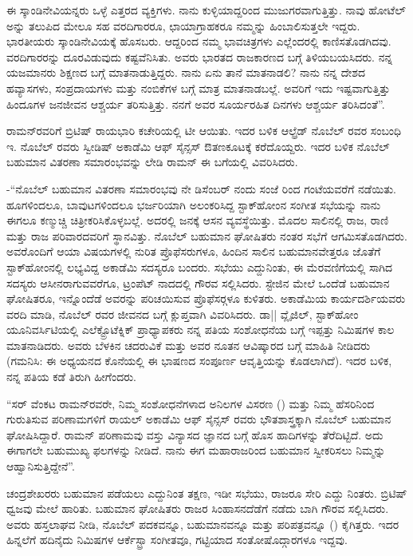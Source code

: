 ಈ ಸ್ಕಾಂಡಿನೇವಿಯನ್ನರು ಒಳ್ಳೆ ಎತ್ತರದ ವ್ಯಕ್ತಿಗಳು. ನಾನು ಕುಳ್ಳಿಯಾದ್ದರಿಂದ ಮುಜುಗರವಾಗುತ್ತಿತ್ತು. ನಾವು ಹೋಟೆಲ್ ಅನ್ನು ತಲುಪಿದ ಮೇಲೂ ಸಹ ವರದಿಗಾರರೂ, ಛಾಯಾಗ್ರಾಹಕರೂ ನಮ್ಮನ್ನು ಹಿಂಬಾಲಿಸುತ್ತಲೇ ಇದ್ದರು. ಭಾರತೀಯರು ಸ್ಕಾಂಡಿನೇವಿಯಕ್ಕೆ ಹೊಸಬರು. ಆದ್ದರಿಂದ ನಮ್ಮ ಭಾವಚಿತ್ರಗಳು ಎಲ್ಲೆಂದರಲ್ಲಿ ಕಾಣಿಸತೊಡಗಿದವು. ವರದಿಗಾರರನ್ನು ದೂರವಿಡುವುದು ಕಷ್ಟವೆನಿಸಿತು. ಅವರು ಭಾರತದ ರಾಜಕಾರಣದ ಬಗ್ಗೆ ತಿಳಿಯಬಯಸಿದರು. ನನ್ನ ಯಜಮಾನರು ಶಿಕ್ಷಣದ ಬಗ್ಗೆ ಮಾತನಾಡುತ್ತಿದ್ದರು. ನಾನು ಏನು ತಾನೆ ಮಾತನಾಡಲಿ? ನಾನು ನನ್ನ ದೇಶದ ಹವ್ಯಾಸಗಳು, ಸಂಪ್ರದಾಯಗಳು ಮತ್ತು ನಂಬಿಕೆಗಳ ಬಗ್ಗೆ ಮಾತ್ರ ಮಾತನಾಡಬಲ್ಲೆ. ಅವರಿಗೆ ಇದು ಇಷ್ಟವಾಗುತ್ತಿತ್ತು ಹಿಂದೂಗಳ ಜನಜೀವನ ಆಶ್ಚರ್ಯ ತರಿಸುತ್ತಿತ್ತು. ನನಗೆ ಅವರ ಸೂರ್ಯರಹಿತ ದಿನಗಳು ಆಶ್ಚರ್ಯ ತರಿಸಿದಂತೆ”.

ರಾಮನ್‍ರವರಿಗೆ ಬ್ರಿಟಿಷ್ ರಾಯಭಾರಿ ಕಚೇರಿಯಲ್ಲಿ ಟೀ ಆಯಿತು. ಇದರ ಬಳಿಕ ಆಲ್ಫ್ರೆಡ್ ನೊಬೆಲ್ ರವರ ಸಂಬಂಧಿ ಇ. ನೊಬೆಲ್ ರವರು ಸ್ವೀಡಿಷ್ ಅಕಾಡೆಮಿ ಆಫ್ ಸೈನ್ಸಸ್ ಔತಣಕೂಟಕ್ಕೆ ಕರೆದೊಯ್ದರು. ಇದರ ಬಳಿಕ ನೊಬೆಲ್ ಬಹುಮಾನ ವಿತರಣಾ ಸಮಾರಂಭವನ್ನು ಲೇಡಿ ರಾಮನ್ ಈ ಬಗೆಯಲ್ಲಿ ವಿವರಿಸಿದರು.

-“ನೊಬೆಲ್ ಬಹುಮಾನ ವಿತರಣಾ ಸಮಾರಂಭವು ನೇ ಡಿಸೆಂಬರ್ ನಂದು ಸಂಜೆ  ರಿಂದ  ಗಂಟೆಯವರೆಗೆ ನಡೆಯಿತು. ಹೂಗಳಿಂದಲೂ, ಬಾವುಟಗಳಿಂದಲೂ ಭರ್ಜರಿಯಾಗಿ ಅಲಂಕರಿಸಿದ್ದ ಸ್ಟಾಕ್‍ಹೋಂನ ಸಂಗೀತ ಸಭೆಯನ್ನು ನಾನು ಈಗಲೂ ಕಣ್ಮುಚ್ಚಿ ಚಿತ್ರೀಕರಿಸಿಕೊಳ್ಳಬಲ್ಲೆ. ಅದರಲ್ಲಿ  ಜನಕ್ಕೆ ಆಸನ ವ್ಯವಸ್ಥೆಯಿತ್ತು. ಮೊದಲ ಸಾಲಿನಲ್ಲಿ ರಾಜ, ರಾಣಿ ಮತ್ತು ರಾಜ ಪರಿವಾರದವರಿಗೆ ಸ್ಥಾನವಿತ್ತು. ನೊಬೆಲ್ ಬಹುಮಾನ ಘೋಷಿತರು ನಂತರ ಸಭೆಗೆ ಆಗಮಿಸತೊಡಗಿದರು. ಅವರೊಂದಿಗೆ ಆಯಾ ವಿಷಯಗಳಲ್ಲಿ ನುರಿತ ಪ್ರೊಫೆಸರುಗಳೂ, ಹಿಂದಿನ ಸಾಲಿನ ಬಹುಮಾನವೇತ್ತರೂ ಜೊತೆಗೆ ಸ್ಟಾಕ್‍ಹೋಂನಲ್ಲಿ ಲಭ್ಯವಿದ್ದ ಅಕಾಡೆಮಿ ಸದಸ್ಯರೂ ಬಂದರು. ಸಭೆಯು ಎದ್ದುನಿಂತು, ಈ ಮೆರವಣಿಗೆಯಲ್ಲಿ ಸಾಗಿದ ಸದಸ್ಯರು ಆಸೀನರಾಗುವವರೆಗೂ, ಟ್ರಂಪೆಟ್ ನಾದದಲ್ಲಿ ಗೌರವ ಸಲ್ಲಿಸಿದರು. ಸ್ಟೇಜಿನ ಮೇಲೆ ಒಂದೆಡೆ ಬಹುಮಾನ ಘೋಷಿತರೂ, ಇನ್ನೊಂದೆಡೆ ಅವರನ್ನು ಪರಿಚಯಿಸುವ ಪ್ರೊಫೆಸರ್‍ಗಳೂ ಕುಳಿತರು. ಅಕಾಡೆಮಿಯ ಕಾರ್ಯದರ್ಶಿಯವರು ವರದಿ ಮಾಡಿ, ನೊಬೆಲ್ ರವರ ಜೀವನದ ಬಗ್ಗೆ ಕ್ಲುಪ್ತವಾಗಿ ವಿವರಿಸಿದರು. ಡಾ|| ವ್ಲೈಜಿಲ್, ಸ್ಟಾಕ್‍ಹೋಂ ಯೂನಿವರ್ಸಿಟಿಯಲ್ಲಿ ಎಲೆಕ್ಟ್ರೊಟೆಕ್ನಿಕ್ ಪ್ರಾಧ್ಯಾಪಕರು ನನ್ನ ಪತಿಯ ಸಂಶೋಧನೆಯ ಬಗ್ಗೆ ಇಪ್ಪತ್ತು ನಿಮಿಷಗಳ ಕಾಲ ಮಾತನಾಡಿದರು. ಅವರು ಬೆಳಕಿನ ಚದರುವಿಕೆ ಮತ್ತು ಅವರ ನೂತನ ಆವಿಷ್ಕಾರದ ಬಗ್ಗೆ ಮಾಹಿತಿ ನೀಡಿದರು (ಗಮನಿಸಿ: ಈ ಅಧ್ಯಯನದ ಕೊನೆಯಲ್ಲಿ ಈ ಭಾಷಣದ ಸಂಪೂರ್ಣ ಆವೃತ್ತಿಯನ್ನು ಕೊಡಲಾಗಿದೆ). ಇದರ ಬಳಿಕ, ನನ್ನ ಪತಿಯ ಕಡೆ ತಿರುಗಿ ಹೀಗೆಂದರು.

“ಸರ್ ವೆಂಕಟ ರಾಮನ್‍ರವರೇ, ನಿಮ್ಮ ಸಂಶೋಧನೆಗಳಾದ ಅನಿಲಗಳ ವಿಸರಣ () ಮತ್ತು ನಿಮ್ಮ ಹೆಸರಿನಿಂದ ಗುರುತಿಸುವ ಪರಿಣಾಮಗಳಿಗೆ ರಾಯಲ್ ಅಕಾಡೆಮಿ ಆಫ್ ಸೈನ್ಸಸ್ ರವರು ಭೌತಶಾಸ್ತ್ರಕ್ಕಾಗಿ ನೊಬೆಲ್ ಬಹುಮಾನ ಘೋಷಿಸಿದ್ದಾರೆ. ರಾಮನ್ ಪರಿಣಾಮವು ವಸ್ತು ವಿನ್ಯಾಸದ ಜ್ಞಾನದ ಬಗ್ಗೆ ಹೊಸ ಹಾದಿಗಳನ್ನು ತೆರೆದಿಟ್ಟಿದೆ. ಅದು ಈಗಾಗಲೇ ಬಹುಮುಖ್ಯ ಫಲಗಳನ್ನು ನೀಡಿದೆ. ನಾನು ಈಗ ಮಹಾರಾಜರಿಂದ ಬಹುಮಾನ ಸ್ವೀಕರಿಸಲು ನಿಮ್ಮನ್ನು ಆಹ್ವಾನಿಸುತ್ತಿದ್ದೇನೆ”.

ಚಂದ್ರಶೇಖರರು ಬಹುಮಾನ ಪಡೆಯಲು ಎದ್ದುನಿಂತ ತಕ್ಷಣ, ಇಡೀ ಸಭೆಯು, ರಾಜರೂ ಸೇರಿ ಎದ್ದು ನಿಂತರು. ಬ್ರಿಟಿಷ್ ಧ್ವಜವು ಮೇಲೆ ಹಾರಿತು. ಬಹುಮಾನ ಘೋಷಿತರು ರಾಜರ ಸಿಂಹಾಸನದೆಡೆಗೆ ನಡೆದು ಬಾಗಿ ಗೌರವ ಸಲ್ಲಿಸಿದರು. ಅವರು ಹಸ್ತಲಾಘವ ನೀಡಿ, ನೊಬೆಲ್ ಪದಕವನ್ನೂ, ಬಹುಮಾನವನ್ನೂ ಮತ್ತು ಪರಿಪತ್ರವನ್ನೂ () ಕೈಗಿತ್ತರು. ಇದರ ಹಿನ್ನಲೆಗೆ ಹದಿನೈದು ನಿಮಿಷಗಳ ಆರ್ಕೆಸ್ಟ್ರಾ ಸಂಗೀತವೂ, ಗಟ್ಟಿಯಾದ ಸಂತೋಷೊದ್ಗಾರಗಳೂ ಇದ್ದವು.

